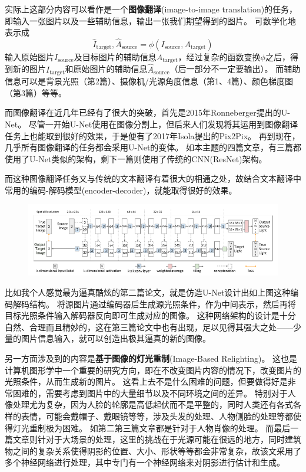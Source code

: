 \documentclass[logo,reportComp]{thesis}
\begin{document}
实际上这部分内容可以看作是一个\textbf{图像翻译}(image-to-image translation)的任务，即输入一张图片以及一些辅助信息，输出一张我们期望得到的图片。
可数学化地表示成
\[\hat{I}_\text{target},\hat{A}_\text{source}=\phi(I_\text{source},A_\text{target})\]
输入原始图片$I_\text{source}$及目标图片的辅助信息$A_\text{target}$，经过复杂的函数变换$\phi$之后，得到新的图片$I_\text{target}$和原始图片的辅助信息$\hat{A}_\text{source}$（后一部分不一定要输出）。
而辅助信息可以是背景光照（第2篇）、摄像机/光源角度信息（第1、4篇）、颜色梯度图（第3篇）等等。

而图像翻译在近几年已经有了很大的突破，首先是2015年Ronneberger提出的U-Net\cite{ronneberger:unet}。
尽管一开始U-Net使用在图像分割上，但后来人们发现将其运用到图像翻译任务上也能取到很好的效果，于是便有了2017年Isola提出的Pix2Pix\cite{isola:pix2pix}。
再到现在，几乎所有图像翻译的任务都会采用U-Net的变体。
如本主题的四篇文章，有三篇都使用了U-Net类似的架构，剩下一篇则使用了传统的CNN(ResNet\cite{he:resnet})架构。

而这种图像翻译任务又与传统的文本翻译有着很大的相通之处，故结合文本翻译中常用的编码-解码模型(encoder-decoder)\cite{sutskever:seq2seq}，就能取得很好的效果。
\begin{figure}[H]
\centering
\includegraphics[width=0.8\linewidth]{pr-net.png}
\end{figure}
比如我个人感觉最为逼真酷炫的第二篇论文，就是仿造U-Net设计出如上图这种编码解码结构。
将源图片通过编码器后生成源光照条件，作为中间表示，然后再将目标光照条件输入解码器反向即可生成对应的图像。
这种网络架构的设计是十分自然、合理而且精妙的，这在第三篇论文中也有出现，足以见得其强大之处——少量的图片信息输入，就可以创造出极其逼真的新的图像。

\bigskip

另一方面涉及到的内容是\textbf{基于图像的灯光重制}(Image-Based Relighting)。
这也是计算机图形学中一个重要的研究方向，即在不改变图片内容的情况下，改变图片的光照条件，从而生成新的图片。
这看上去不是什么困难的问题，但要做得好是非常困难的，需要考虑到图片中的大量细节以及不同环境之间的差异。
特别对于人像处理尤为复杂，因为人脸的轮廓是高低起伏而不是平整的，同时人类还有各式各样的表情，可能会戴帽子、戴眼镜等等，涉及头发的处理、人物侧脸的处理等都使得灯光重制极为困难。
如第二第三篇文章都是针对于人物肖像的处理。
而最后一篇文章则针对于大场景的处理，这里的挑战在于光源可能在很远的地方，同时建筑物之间的复杂关系使得阴影的位置、大小、形状等等都会非常复杂，故该文采用了多个神经网络进行处理，其中专门有一个神经网络来对阴影进行估计和生成。
\end{document}
